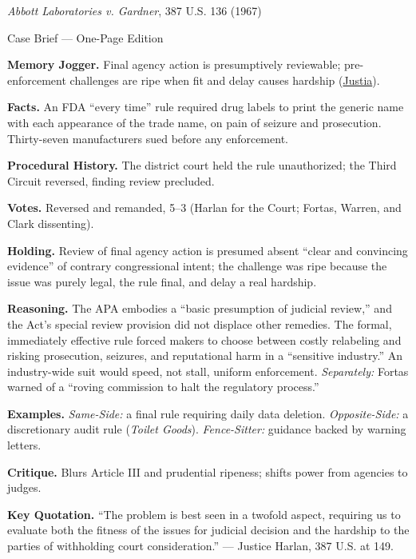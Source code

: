 \documentclass[12pt]{article}
\begin{document}
\begin{center}
{\Large \textit{Abbott Laboratories v. Gardner}, 387 U.S. 136 (1967)\par}
\vspace{0.3em}
{\normalsize Case Brief --- One-Page Edition\par}
\end{center}

\textbf{Memory Jogger.} Final agency action is presumptively reviewable; pre-enforcement challenges are ripe when fit and delay causes hardship (\href{https://supreme.justia.com/cases/federal/us/387/136/}{Justia}).

\textbf{Facts.} An FDA ``every time'' rule required drug labels to print the generic name with each appearance of the trade name, on pain of seizure and prosecution. Thirty-seven manufacturers sued before any enforcement.

\textbf{Procedural History.} The district court held the rule unauthorized; the Third Circuit reversed, finding review precluded.

\textbf{Votes.} Reversed and remanded, 5--3 (Harlan for the Court; Fortas, Warren, and Clark dissenting).

\textbf{Holding.} Review of final agency action is presumed absent ``clear and convincing evidence'' of contrary congressional intent; the challenge was ripe because the issue was purely legal, the rule final, and delay a real hardship.

\textbf{Reasoning.} The APA embodies a ``basic presumption of judicial review,'' and the Act's special review provision did not displace other remedies. The formal, immediately effective rule forced makers to choose between costly relabeling and risking prosecution, seizures, and reputational harm in a ``sensitive industry.'' An industry-wide suit would speed, not stall, uniform enforcement. \emph{Separately:} Fortas warned of a ``roving commission to halt the regulatory process.''

\textbf{Examples.} \emph{Same-Side:} a final rule requiring daily data deletion. \emph{Opposite-Side:} a discretionary audit rule (\textit{Toilet Goods}). \emph{Fence-Sitter:} guidance backed by warning letters.

\textbf{Critique.} Blurs Article III and prudential ripeness; shifts power from agencies to judges.

\textbf{Key Quotation.} ``The problem is best seen in a twofold aspect, requiring us to evaluate both the fitness of the issues for judicial decision and the hardship to the parties of withholding court consideration.'' --- Justice Harlan, 387 U.S. at 149.
\end{document}
